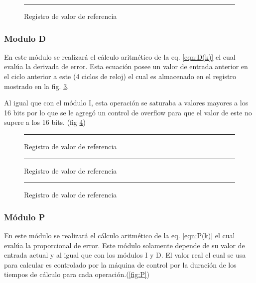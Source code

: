 \documentclass[12pt,a4paper]{article} %
\begin{document}
\begin{figure}[htbp]
  \centering
    \rule{35em}{0.3pt}
  \caption[reg_i]{Registro de valor de referencia}
  \label{fig:regI}
\end{figure}

\subsubsection{Modulo D}

En este módulo se realizará el cálculo aritmético de la eq. \ref{eqn:D(k)} el cual evalúa la derivada de error. Esta ecuación posee un valor de entrada anterior en el ciclo anterior a este (4 ciclos de reloj) el cual es almacenado en el registro mostrado en la fig. \ref{fig:yk1}.

Al igual que con el módulo I, esta operación se saturaba a valores mayores a los 16 bits por lo que se le agregó un control de overflow para que el valor de este no supere a los 16 bits. (fig \ref{fig:overf})

\begin{figure}[htbp]
  \centering
    \rule{35em}{0.3pt}
  \caption[D]{Registro de valor de referencia}
  \label{fig:D}
\end{figure}

\begin{figure}[htbp]
  \centering
    \rule{35em}{0.3pt}
  \caption[yk1]{Registro de valor de referencia}
  \label{fig:yk1}
\end{figure}

\begin{figure}[htbp]
  \centering
    \rule{35em}{0.3pt}
  \caption[overf]{Registro de valor de referencia}
  \label{fig:overf}
\end{figure}

\subsubsection{Módulo P}

En este módulo se realizará el cálculo aritmético de la eq. \ref{eqn:P(k)} el cual evalúa la proporcional de error. Este módulo solamente depende de su valor de entrada actual y al igual que con los módulos I y D. El valor real el cual se usa para calcular es controlado por la máquina de control por la duración de los tiempos de cálculo para cada operación.(\ref{fig:P})
\end{document}
